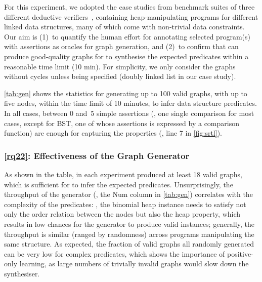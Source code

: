 For this experiment, we adopted the case studies from benchmark suites
of three different deductive
verifiers~\cite{vcdryad,Piskac-al:TACAS14,Jacobs-al:NFM11}, containing
heap-manipulating programs for different linked data structures, many
of which come with non-trivial data constraints.
%
Our aim is (1)~to quantify the human effort for annotating selected
program(s) with assertions as oracles for graph generation, and (2)~to
confirm that \ggen can produce good-quality graphs for \tool to
synthesise the expected predicates within a reasonable time limit (10
min). For simplicity, we only consider the graphs without cycles
unless being specified (doubly linked list in our case study).




\autoref{tab:gen} shows the statistics for generating up to 100 valid
graphs, with up to five nodes, within the time limit of 10 minutes, to
infer data structure predicates.
%
In all cases, between 0 and~5 simple assertions (\ie, one single
comparison for most cases, except for BST, one of whose assertions is
expressed by a comparison function) are enough for capturing the properties
(\eg, line 7 in \autoref{fig:srtl}).



%
\subsubsection*{\ref{rq22}: Effectiveness of the Graph Generator}

As shown in the table, in each experiment \ggen produced at least 18
valid graphs, which is sufficient for \tool to infer the expected
predicates. Unsurprisingly, the throughput of the generator (\ie,
the Num column in \autoref{tab:gen}) correlates with the
complexity of the predicates: \eg, the binomial heap
instance needs to satisfy not only the order relation between the
nodes but also the heap property, which results in low chances
for the generator to produce valid instances; generally, the throughput is similar (ranged by randomness)
 across programs manipulating the same structure.
%
As expected, the fraction of valid graphs \wrt all randomly generated
can be very low for complex predicates, which shows the importance of
positive-only learning, as large numbers of trivially invalid graphs
would slow down the synthesiser.

